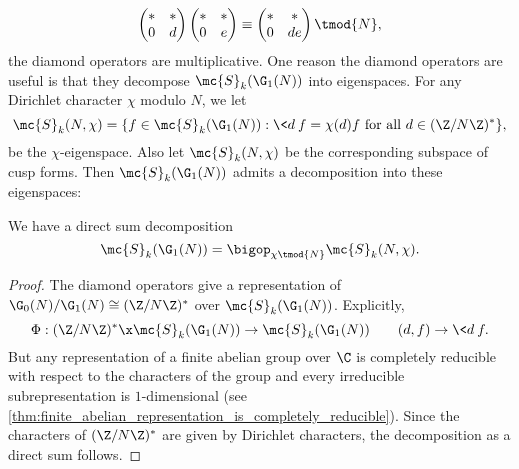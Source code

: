     \[
      \begin{pmatrix} \ast & \ast \\ 0 & d \end{pmatrix}\begin{pmatrix} \ast & \ast \\ 0 & e \end{pmatrix} \equiv \begin{pmatrix} \ast & \ast \\ 0 & de \end{pmatrix} \tmod{N},
    \]
    the diamond operators are multiplicative. One reason the diamond operators are useful is that they decompose $\mc{S}_{k}(\G_{1}(N))$ into eigenspaces. For any Dirichlet character $\chi$ modulo $N$, we let
    \[
      \mc{S}_{k}(N,\chi) = \{f \in \mc{S}_{k}(\G_{1}(N)):\text{$\<d\>f = \chi(d)f$ for all $d \in (\Z/N\Z)^{\ast}$}\},
    \]
    be the $\chi$-eigenspace. Also let $\mc{S}_{k}(N,\chi)$ be the corresponding subspace of cusp forms. Then $\mc{S}_{k}(\G_{1}(N))$ admits a decomposition into these eigenspaces:

    \begin{proposition}\label{thm:diamond_operator_decomposition_holomorphic}
      We have a direct sum decomposition
      \[
        \mc{S}_{k}(\G_{1}(N)) = \bigop_{\chi \tmod{N}}\mc{S}_{k}(N,\chi).
      \]
    \end{proposition}
    \begin{proof}
      The diamond operators give a representation of $\G_{0}(N)/\G_{1}(N) \cong (\Z/N\Z)^{\ast}$ over $\mc{S}_{k}(\G_{1}(N))$. Explicitly,
      \[
        \Phi:(\Z/N\Z)^{\ast} \x \mc{S}_{k}(\G_{1}(N)) \to \mc{S}_{k}(\G_{1}(N)) \qquad (d,f) \to \<d\>f.
      \]
      But any representation of a finite abelian group over $\C$ is completely reducible with respect to the characters of the group and every irreducible subrepresentation is $1$-dimensional (see \cref{thm:finite_abelian_representation_is_completely_reducible}). Since the characters of $(\Z/N\Z)^{\ast}$ are given by Dirichlet characters, the decomposition as a direct sum follows.
    \end{proof}
    
